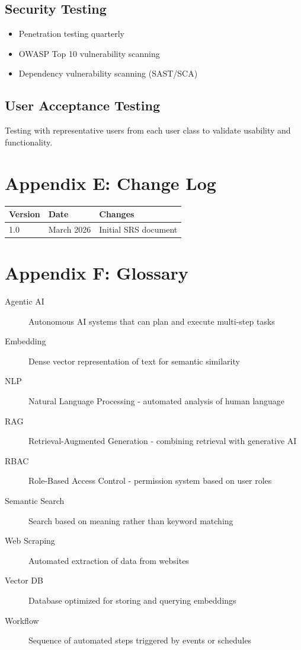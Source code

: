 \documentclass{report}
\begin{document}
\subsection{Security Testing}
\begin{itemize}
    \item Penetration testing quarterly
    \item OWASP Top 10 vulnerability scanning
    \item Dependency vulnerability scanning (SAST/SCA)
\end{itemize}

\subsection{User Acceptance Testing}
Testing with representative users from each user class to validate usability and functionality.

\section{Appendix E: Change Log}

\begin{table}[h]
\centering
\begin{tabular}{|l|l|l|}
\hline
\textbf{Version} & \textbf{Date} & \textbf{Changes} \\
\hline
1.0 & March 2026 & Initial SRS document \\
\hline
\end{tabular}
\end{table}

\section{Appendix F: Glossary}

\begin{description}
    \item[Agentic AI] Autonomous AI systems that can plan and execute multi-step tasks
    \item[Embedding] Dense vector representation of text for semantic similarity
    \item[NLP] Natural Language Processing - automated analysis of human language
    \item[RAG] Retrieval-Augmented Generation - combining retrieval with generative AI
    \item[RBAC] Role-Based Access Control - permission system based on user roles
    \item[Semantic Search] Search based on meaning rather than keyword matching
    \item[Web Scraping] Automated extraction of data from websites
    \item[Vector DB] Database optimized for storing and querying embeddings
    \item[Workflow] Sequence of automated steps triggered by events or schedules
\end{description}
\end{document}
